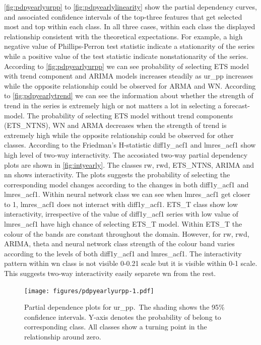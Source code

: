 \documentclass[11pt,a4paper,]{article}
\begin{document}
\autoref{fig:pdpyearlyurpp} to \autoref{fig:pdpyearlylinearity} show the partial dependency curves, and associated confidence intervals of the top-three features that get selected most and top within each class. In all three cases, within each class the displayed relationship consistent with the theoretical expectations. For example, a high negative value of Phillips-Perron test statistic indicate a stationarity of the series while a positive value of the test statistic indicate nonstationarity of the series. According to \autoref{fig:pdpyearlyurpp} we can see probability of selecting ETS model with trend component and ARIMA models increases steadily as ur\_pp increases while the opposite relationship could be observed for ARMA and WN. According to \autoref{fig:pdpyearlytrend} we can see the information about whether the strength of trend in the series is extremely high or not matters a lot in selecting a forecast-model. The probability of selecting ETS model without trend components (ETS\_NTNS), WN and ARMA decreases when the strength of trend is extremely high while the opposite relationship could be observed for other classes. According to the Friedman's H-statistic diff1y\_acf1 and lmres\_acf1 show high level of two-way interactivity. The accosiated two-way partial dependency plots are shown in \autoref{fig:intyearly}. The classes rw, rwd, ETS\_NTNS, ARIMA and nn shows interactivity. The plots suggests the probability of selecting the corresponding model changes according to the changes in both diff1y\_acf1 and lmres\_acf1. Within neural network class we can see when lmres\_acf1 get closer to 1, lmres\_acf1 does not interact with diff1y\_acf1. ETS\_T class show low interactivity, irrespective of the value of diff1y\_acf1 series with low value of lmres\_acf1 have high chance of selecting ETS\_T model. Within ETS\_T the colour of the bands are constant throughout the domain. However, for rw, rwd, ARIMA, theta and neural network class strength of the colour band varies according to the levels of both diff1y\_acf1 and lmres\_acf1. The interactivity pattern within wn class is not visible 0-0.21 scale but it is visible within 0-1 scale. This suggests two-way interactivity easily separete wn from the rest.

\begin{figure}
\centering
\texttt{[image: figures/pdpyearlyurpp-1.pdf]}
\caption{\label{fig:pdpyearlyurpp}Partial dependence plots for ur\_pp.~The shading shows the 95\% confidence intervals. Y-axis denotes the probability of belong to corresponding class. All classes show a turning point in the relationship around zero.}
\end{figure}
\end{document}
